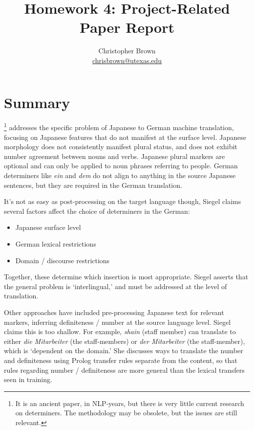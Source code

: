 \documentclass[11pt]{article}
\title{Homework 4: Project-Related Paper Report}
\author{Christopher Brown\smallskip\\\href{mailto:chrisbrown@utexas.edu}{chrisbrown@utexas.edu}}
\begin{document}
\maketitle


\setlength{\topsep}{0pt}
\section{Summary}

\citet{siegel:1996}\footnote{It is an ancient paper, in NLP-years, but there is very little current research on determiners. The methodology may be obsolete, but the issues are still relevant.} addresses the specific problem of Japanese to German machine translation, focusing on Japanese features that do not manifest at the surface level. Japanese morphology does not consistently manifest plural status, and does not exhibit number agreement between nouns and verbs. Japanese plural markers are optional and can only be applied to noun phrases referring to people.
German determiners like \emph{ein} and \emph{dem} do not align to anything in the source Japanese sentences, but they are required in the German translation.

It's not as easy as post-processing on the target language though, Siegel claims several factors affect the choice of determiners in the German:
\begin{itemize}[itemsep=0pt,topsep=6pt]
  \item Japanese surface level
  \item German lexical restrictions
  \item Domain / discourse restrictions
\end{itemize}
Together, these determine which insertion is most appropriate. Siegel asserts that the general problem is `interlingual,' and must be addressed at the level of translation.

Other approaches have included pre-processing Japanese text for relevant markers, inferring definiteness / number at the source language level.
Siegel claims this is too shallow. For example, \emph{shain} (staff member) can translate to either \emph{die Mitarbeiter} (the staff-members) or \emph{der Mitarbeiter} (the staff-member), which is `dependent on the domain.'
She discusses ways to translate the number and definiteness using Prolog transfer rules separate from the content, so that rules regarding number / definiteness are more general than the lexical transfers seen in training.
\end{document}
